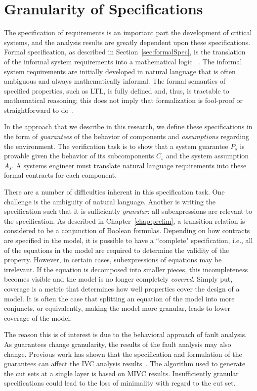 \chapter{Granularity of Specifications}
\label{chap:granularity}
The specification of requirements is an important part the development of critical systems, and the analysis results are greatly dependent upon these specifications. Formal specification, as described in Section~\ref{sec:formalSpec}, is the translation of the informal system requirements into a mathematical logic ~\cite{hinchey2012industrial}. The informal system requirements are initially developed in natural language that is often ambiguous and always mathematically informal. The formal semantics of specified properties, such as LTL, is fully defined and, thus, is tractable to mathematical reasoning; this does not imply that formalization is fool-proof or straightforward to do~\cite{kotonya1998requirements}. 

 In the approach that we describe in this research, we define these specifications in the form of \emph{guarantees} of the behavior of components and \emph{assumptions} regarding the environment. The verification task is to show that a system guarantee $P_s$ is provable given the behavior of its subcomponents $C_s$ and the system assumption $A_s$. A systems engineer must translate natural language requirements into these formal contracts for each component. 
 
There are a number of difficulties inherent in this specification task. One challenge is the ambiguity of natural language. Another is writing the specification such that it is sufficiently {\em granular}: all subexpressions are relevant to the specification. As described in Chapter~\ref{chap:prelim}, a transition relation is considered to be a conjunction of Boolean formulas. Depending on how contracts are specified in the model, it is possible to have a ``complete" specification, i.e., all of the equations in the model are required to determine the validity of the property. However, in certain cases, subexpressions of equations may be irrelevant. If the equation is decomposed into smaller pieces, this incompleteness becomes visible and the model is no longer completely {\em covered}. Simply put, coverage is a metric that determines how well properties cover the design of a model. It is often the case that splitting an equation of the model into more conjuncts, or equivalently, making the model more granular, leads to lower coverage of the model. 
 
The reason this is of interest is due to the behavioral approach of fault analysis. As guarantees change granularity, the results of the fault analysis may also change. Previous work has shown that the specification and formulation of the guarantees can affect the IVC analysis results~\cite{ghassabani_2018}. The algorithm used to generate the cut sets at a single layer is based on MIVC results. Insufficiently granular specifications could lead to the loss of minimality with regard to the cut set. 

